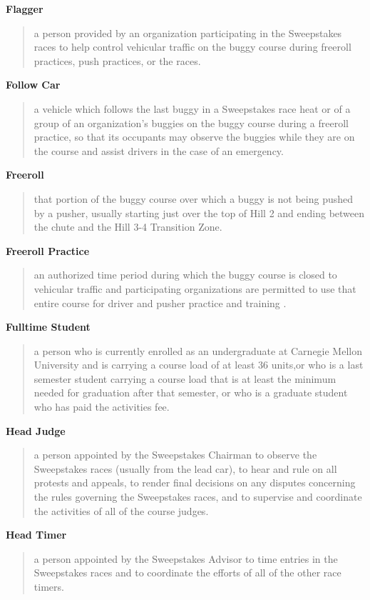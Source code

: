 \documentclass[openany]{book}
\begin{document}
\textbf{Flagger}
\begin{quote}
	a person provided by an organization participating in the Sweepstakes races to help control vehicular traffic on the buggy course during freeroll practices, push practices, or the races.
\end{quote}

\textbf{Follow Car}
\begin{quote}
	a vehicle which follows the last buggy in a Sweepstakes race heat or of a group of an organization's buggies on the buggy course during a freeroll practice, so that its occupants may observe the buggies while they are on the course and assist drivers in the case of an emergency.
\end{quote}

\textbf{Freeroll}
\begin{quote}
	that portion of the buggy course over which a buggy is not being pushed by a pusher, usually starting just over the top of Hill 2 and ending between the chute and the Hill 3-4 Transition Zone.
\end{quote}

\textbf{Freeroll Practice}
\begin{quote}
	an authorized time period during which the buggy course is closed to vehicular traffic and participating organizations are permitted to use that entire course for driver and pusher practice and training .
\end{quote}

\textbf{Fulltime Student}
\begin{quote}
	a person who is currently enrolled as an undergraduate at Carnegie Mellon University and is carrying a course load of at least 36 units,or who is a last semester student carrying a course load that is at least the minimum needed for graduation after that semester, or who is a graduate student who has paid the activities fee.
\end{quote}

\textbf{Head Judge}
\begin{quote}
	a person appointed by the Sweepstakes Chairman to observe the Sweepstakes races (usually from the lead car), to hear and rule on all protests and appeals, to render final decisions on any disputes concerning the rules governing the Sweepstakes races, and to supervise and coordinate the activities of all of the course judges.
\end{quote}

\textbf{Head Timer}
\begin{quote}
	a person appointed by the Sweepstakes Advisor to time entries in the Sweepstakes races and to coordinate the efforts of all of the other race timers.
\end{quote}
\end{document}
